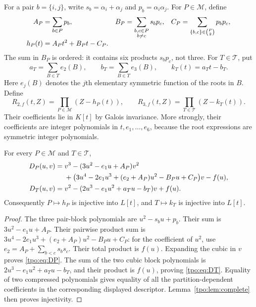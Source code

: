 \documentclass[11pt,letterpaper]{article}
\numberwithin{equation}{section}
\theoremstyle{definition}
\theoremstyle{remark}
\newcommand{\Rtwo}{R_{2,f}}
\newcommand{\Rthree}{R_{3,f}}
\newcommand{\tpoM}{\mathcal M}
\newcommand{\tpoT}{\mathcal T}
\begin{document}
For a pair $b=\{i,j\}$, write $s_b=\alpha_i+\alpha_j$ and
$p_b=\alpha_i\alpha_j$. For $P\in\tpoM$, define
\begin{align}
 A_P&=\sum_{b\in P}p_b,&
 B_P&=\sum_{\substack{b,c\in P\\b\ne c}}s_b p_c,&
 C_P&=\sum_{\{b,c\}\in\binom P2}p_b p_c,\notag\\[-3pt]
 h_P(t)&=A_Pt^2+B_Pt-C_P.&&&
 \label{tpo:eq:h}
\end{align}
The sum in $B_P$ is ordered: it contains six products $s_b p_c$, not three.
For $T\in\tpoT$, put
\begin{equation}
 a_T=\sum_{B\in T}e_2(B),\qquad
 b_T=\sum_{B\in T}e_3(B),\qquad k_T(t)=a_Tt-b_T.
 \label{tpo:eq:k}
\end{equation}
Here $e_j(B)$ denotes the $j$th elementary symmetric function of the roots in
$B$. Define
\begin{equation}
 \Rtwo(t,Z)=\prod_{P\in\tpoM}(Z-h_P(t)),\qquad
 \Rthree(t,Z)=\prod_{T\in\tpoT}(Z-k_T(t)).
 \label{tpo:eq:resolvents}
\end{equation}
Their coefficients lie in $K[t]$ by Galois invariance. More strongly, their
coefficients are integer polynomials in $t,e_1,\ldots,e_6$, because the root
expressions are symmetric integer polynomials.

\begin{proposition}
\label{tpo:prop:compression}
For every $P\in\tpoM$ and $T\in\tpoT$,
\begin{align}
 D_P(u,v)={}&v^3-(3u^2-e_1u+A_P)v^2\notag\\
 &+\bigl(3u^4-2e_1u^3+(e_2+A_P)u^2-B_Pu+C_P\bigr)v-f(u),
 \label{tpo:eq:DP}\\
 D_T(u,v)={}&v^2-(2u^3-e_1u^2+a_Tu-b_T)v+f(u).
 \label{tpo:eq:DT}
\end{align}
Consequently $P\mapsto h_P$ is injective into $L[t]$, and $T\mapsto k_T$ is
injective into $L[t]$.
\end{proposition}
\begin{proof}
The three pair-block polynomials are $u^2-s_bu+p_b$. Their sum is
$3u^2-e_1u+A_P$. Their pairwise product sum is
$3u^4-2e_1u^3+(e_2+A_P)u^2-B_Pu+C_P$: for the coefficient of $u^2$, use
$e_2=A_P+\sum_{b<c}s_bs_c$. Their total product is $f(u)$. Expanding the
cubic in $v$ proves \eqref{tpo:eq:DP}. The sum of the two cubic block polynomials
is $2u^3-e_1u^2+a_Tu-b_T$, and their product is $f(u)$, proving
\eqref{tpo:eq:DT}. Equality of two compressed polynomials gives equality of all
the partition-dependent coefficients in the corresponding displayed
descriptor. Lemma~\ref{tpo:lem:complete} then proves injectivity.
\end{proof}
\end{document}
